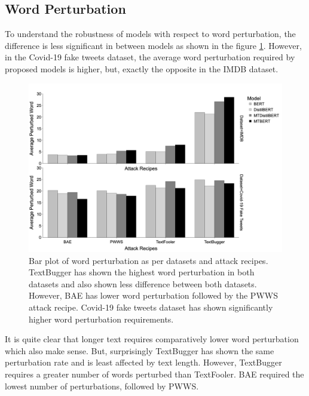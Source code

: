 \documentclass[%
	BCOR=8mm, %
	DIV=12,
	toc=bibliography, %
	toc=listof, %
	oneside, %
	egregdoesnotlikesansseriftitles, %
	]{scrbook}
\begin{document}
\subsection{Word Perturbation}
To understand the robustness of models with respect to word perturbation, the difference is less significant in between models as shown in the figure \ref{fig:avgpertbyattackrecipes}. However, in the Covid-19 fake tweets dataset, the average word perturbation required by proposed models is higher, but, exactly the opposite in the IMDB dataset.
\begin{figure}[H]
    \centering
     \hspace*{2.5em}
    \includegraphics[width=0.9\linewidth]{img/AvgPertByDataset}
    \caption[Bar plot of word perturbation rate]{Bar plot of word perturbation as per datasets and attack recipes. TextBugger has shown the highest word perturbation in both datasets and also shown less difference between both datasets. However, BAE has lower word perturbation followed by the PWWS attack recipe. Covid-19 fake tweets dataset has shown significantly higher word perturbation requirements.  }
    \label{fig:avgpertbyattackrecipes}
\end{figure}
 It is quite clear that longer text requires comparatively lower word perturbation which also make sense. But, surprisingly TextBugger has shown the same perturbation rate and is least affected by text length. However,  TextBugger requires a greater number of words perturbed than TextFooler. BAE required the lowest number of perturbations, followed by PWWS.
\end{document}
